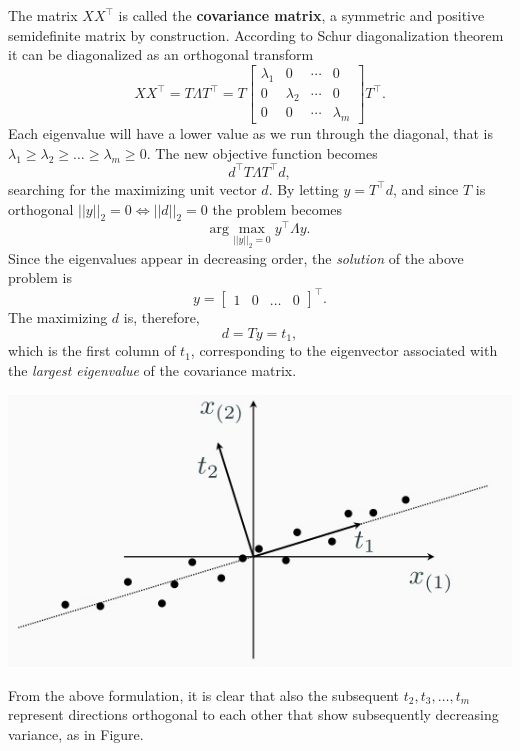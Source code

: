 \documentclass[10pt]{report}
\begin{document}
The matrix \(XX^\top\) is called the \textbf{covariance matrix}, a symmetric and positive semidefinite matrix by construction. According to Schur diagonalization theorem it can be diagonalized as an orthogonal transform $$XX^\top = T\Lambda T^\top = T\begin{bmatrix} \lambda_1 & 0 & \cdots & 0 \\ 0 & \lambda_2 & \cdots & 0 \\ 0 & 0 & \cdots & \lambda_m\end{bmatrix}T^\top.$$ Each eigenvalue will have a lower value as we run through the diagonal, that is \(\lambda_1 \geq \lambda_2 \geq \dots \geq \lambda_m \geq 0\). The new objective function becomes $$d^\top T\Lambda T^\top d,$$ searching for the maximizing unit vector \(d\). By letting \(y = T^\top d\), and since \(T\) is orthogonal \(||y||_2 = 0 \iff ||d||_2=0\) the problem becomes $$\mbox{arg}\max_{||y||_2=0} y^\top \Lambda y.$$ Since the eigenvalues appear in decreasing order, the \emph{solution} of the above problem is $$y = \begin{bmatrix} 1 & 0 & \dots & 0 \end{bmatrix}^\top.$$ The maximizing \(d\) is, therefore, $$d = Ty = t_1,$$ which is the first column of \(t_1\), corresponding to the eigenvector associated with the \emph{largest eigenvalue} of the covariance matrix.

\begin{center}
\includegraphics[scale=0.3]{./pics/alg/pca2.jpg}
\end{center}

From the above formulation, it is clear that also the subsequent \(t_2, t_3, \dots, t_m\) represent directions orthogonal to each other that show subsequently decreasing variance, as in Figure.
\end{document}
